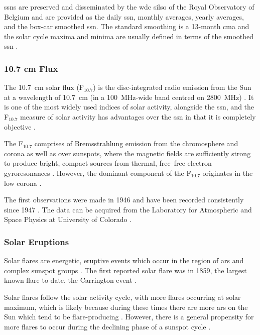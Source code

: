 \glspl{ssn} are preserved and disseminated by the \gls{wdc} \gls{silso} of the Royal Observatory of Belgium \citep{silso_world_data_center_international_2020} and are provided as the daily \gls{ssn}, monthly averages, yearly averages, and the box-car smoothed \gls{ssn}. The standard smoothing is a 13-month \gls{cma} and the solar cycle maxima and minima are usually defined in terms of the smoothed \gls{ssn} \citep{hathaway_solar_2015}.


\subsubsection*{10.7 cm Flux}

The 10.7~cm solar flux (F$_{10.7}$) is the disc-integrated radio emission from the Sun at a wavelength of 10.7~cm (in a 100~MHz-wide band centred on 2800~MHz) \citep{tapping_limits_1994,tapping_107_2013}. It is one of the most widely used indices of solar activity, alongside the \gls{ssn}, and the F$_{10.7}$ measure of solar activity has advantages over the \gls{ssn} in that it is completely objective \citep{hathaway_solar_2015}.

The F$_{10.7}$ comprises of Bremsstrahlung emission from the chromosphere and corona as well as over sunspots, where the magnetic fields are sufficiently strong to produce bright, compact sources from thermal, free–free electron gyroresonances \citep{tapping_origin_1990, tapping_107_2013}. However, the dominant component of the F$_{10.7}$ originates in the low corona \citep{tapping_origin_1990}.

The first observations were made in 1946 and have been recorded consistently since 1947 \citep{covington_solar_1969, tapping_107_2013}. The data can be acquired from the Laboratory for Atmospheric and Space Physics at University of Colorado \citep{lisird_solar_2019}.



\glsresetall 
{}
\subsubsection*{Solar Eruptions}
Solar flares are energetic, eruptive events which occur in the region of \glspl{ar} and complex sunspot groups \citep{hathaway_solar_2015}. The first reported solar flare was in 1859, the largest known flare to-date, the Carrington event \citep{carrington_description_1859}.

Solar flares follow the solar activity cycle, with more flares occurring at solar maximum, which is likely because during these times there are more \glspl{ar} on the Sun which tend to be flare-producing \citep{gopalswamy_corona_2010, hathaway_solar_2015}. However, there is a general propensity for more flares to occur during the declining phase of a sunspot cycle \citep{hathaway_solar_2015}.

